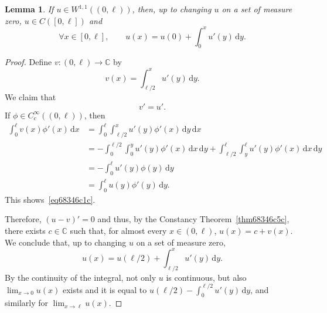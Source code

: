 \documentclass[a4paper,9pt]{amsart}
\newcommand{\C}{\mathbb{C}}	%
\newcommand{\did}{\,\mathrm{d}}	%
\theoremstyle{plain}
\newtheorem{lemma}[proposition]{Lemma}
\theoremstyle{definition}
\theoremstyle{remark}
\begin{document}
\begin{lemma}\label{lem68346d4d}
	If $u\in W^{1,1}((0,\ell))$, then, up to changing $u$ on a set of measure zero, $u\in C([0,\ell])$ and 
	\begin{equation}
		\forall x\in[0,\ell],\qquad
		u(x) = u(0) + \int_0^x u'(y) \did y .
	\end{equation}
\end{lemma}
\begin{proof}
	Define $v:(0,\ell)\to\C$ by
	\begin{equation}
		v(x) = \int_{\ell/2}^x u'(y) \did y .
	\end{equation}
	We claim that
	\begin{equation}\label{eq68346c1c}
		v' = u' .
	\end{equation}
	If $\phi\in C^\infty_c((0,\ell))$, then
	\begin{align}
		\int_0^\ell v(x)\phi'(x)\did x
		&= \int_0^\ell \int_{\ell/2}^x u'(y) \phi'(x)\did y \did x \\
		&= - \int_0^{\ell/2} \int_0^y u'(y) \phi'(x) \did x\did y 
			+ \int_{\ell/2}^\ell \int_y^\ell u'(y) \phi'(x) \did x\did y \\
		&= - \int_0^\ell u'(y) \phi(y) \did y \\
		&= \int_0^\ell u(y) \phi'(y) \did y .
	\end{align}
	This shows~\eqref{eq68346c1c}.
	
	Therefore, $(u-v)'=0$ and thus, by the Constancy Theorem~\ref{thm68346c5c}, there exists $c\in \C$ such that, for almost every $x\in(0,\ell)$, $u(x)= c+v(x)$.
	We conclude that, up to changing $u$ on a set of measure zero, 
	\begin{equation}
		u(x) = u(\ell/2) + \int_{\ell/2}^x u'(y) \did y .
	\end{equation}
	By the continuity of the integral, not only $u$ is continuous, but also
	$\lim_{x\to0} u(x)$ exists and it is equal to $u(\ell/2) - \int_0^{\ell/2} u'(y) \did y$,
	and similarly for $\lim_{x\to\ell} u(x)$.
\end{proof}
\end{document}
